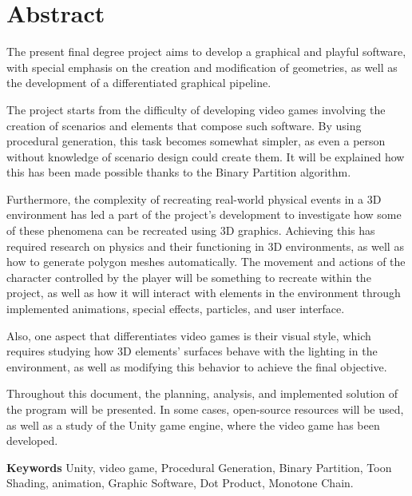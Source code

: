 \chapter{Abstract}

The present final degree project aims to develop a graphical and playful software, with special emphasis on the creation and modification of geometries, as well as the development of a differentiated graphical pipeline.

The project starts from the difficulty of developing video games involving the creation of scenarios and elements that compose such software. By using procedural generation, this task becomes somewhat simpler, as even a person without knowledge of scenario design could create them. It will be explained how this has been made possible thanks to the Binary Partition algorithm.

Furthermore, the complexity of recreating real-world physical events in a 3D environment has led a part of the project's development to investigate how some of these phenomena can be recreated using 3D graphics. Achieving this has required research on physics and their functioning in 3D environments, as well as how to generate polygon meshes automatically. The movement and actions of the character controlled by the player will be something to recreate within the project, as well as how it will interact with elements in the environment through implemented animations, special effects, particles, and user interface.

Also, one aspect that differentiates video games is their visual style, which requires studying how 3D elements' surfaces behave with the lighting in the environment, as well as modifying this behavior to achieve the final objective.

Throughout this document, the planning, analysis, and implemented solution of the program will be presented. In some cases, open-source resources will be used, as well as a study of the Unity game engine, where the video game has been developed.

\textbf{Keywords} Unity, video game, Procedural Generation, Binary Partition, Toon Shading, animation, Graphic Software, Dot Product, Monotone Chain.